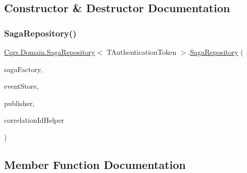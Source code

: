\subsection{Constructor \& Destructor Documentation}
\mbox{\label{classCqrs_1_1Domain_1_1SagaRepository_a2981231b25fa89133ab50796cd352fbf_a2981231b25fa89133ab50796cd352fbf}} 
\subsubsection{\texorpdfstring{Saga\+Repository()}{SagaRepository()}}
{\footnotesize\ttfamily \hyperlink{classCqrs_1_1Domain_1_1SagaRepository}{Cqrs.\+Domain.\+Saga\+Repository}$<$ T\+Authentication\+Token $>$.\hyperlink{classCqrs_1_1Domain_1_1SagaRepository}{Saga\+Repository} (\begin{DoxyParamCaption}\item[{\hyperlink{interfaceCqrs_1_1Domain_1_1Factories_1_1IAggregateFactory}{I\+Aggregate\+Factory}}]{saga\+Factory,  }\item[{\hyperlink{interfaceCqrs_1_1Events_1_1IEventStore}{I\+Event\+Store}$<$ T\+Authentication\+Token $>$}]{event\+Store,  }\item[{\hyperlink{interfaceCqrs_1_1Events_1_1IEventPublisher}{I\+Event\+Publisher}$<$ T\+Authentication\+Token $>$}]{publisher,  }\item[{I\+Correlation\+Id\+Helper}]{correlation\+Id\+Helper }\end{DoxyParamCaption})}



\subsection{Member Function Documentation}
\mbox{\label{classCqrs_1_1Domain_1_1SagaRepository_acb23e0bd3e5655547a13b4ad2b06e548_acb23e0bd3e5655547a13b4ad2b06e548}} 
